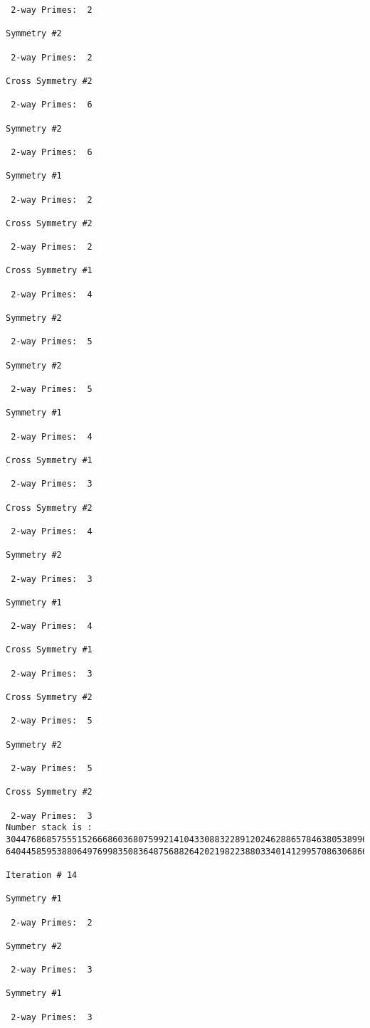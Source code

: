 \begin{verbatim}
 2-way Primes: 	2

Symmetry #2

 2-way Primes: 	2

Cross Symmetry #2

 2-way Primes: 	6

Symmetry #2

 2-way Primes: 	6

Symmetry #1

 2-way Primes: 	2

Cross Symmetry #2

 2-way Primes: 	2

Cross Symmetry #1

 2-way Primes: 	4

Symmetry #2

 2-way Primes: 	5

Symmetry #2

 2-way Primes: 	5

Symmetry #1

 2-way Primes: 	4

Cross Symmetry #1

 2-way Primes: 	3

Cross Symmetry #2

 2-way Primes: 	4

Symmetry #2

 2-way Primes: 	3

Symmetry #1

 2-way Primes: 	4

Cross Symmetry #1

 2-way Primes: 	3

Cross Symmetry #2

 2-way Primes: 	5

Symmetry #2

 2-way Primes: 	5

Cross Symmetry #2

 2-way Primes: 	3
Number stack is :
30447686857555152666860368075992141043308832289120246288657846380538996794608835958544046240163340857
64044585953880649769983508364875688264202198223880334014129957086306866625155575868674403758043361042

Iteration #	14

Symmetry #1

 2-way Primes: 	2

Symmetry #2

 2-way Primes: 	3

Symmetry #1

 2-way Primes: 	3


\end{verbatim}
